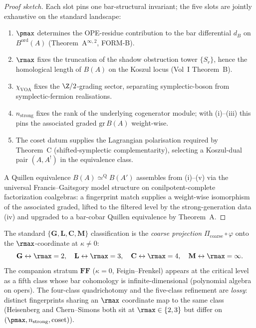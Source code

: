 \begin{proof}[Proof sketch]
Each slot pins one bar-structural invariant; the five slots are jointly exhaustive on the standard landscape:
\begin{enumerate}
 \item[(i)] $\pmax$ determines the OPE-residue contribution to the bar differential $d_B$ on $B^{\mathrm{ord}}(A)$ (Theorem~A$^{\infty,2}$, FORM-B).
 \item[(ii)] $\rmax$ fixes the truncation of the shadow obstruction tower $\{S_r\}$, hence the homological length of $B(A)$ on the Koszul locus (Vol~I Theorem~B).
 \item[(iii)] $\chi_{\mathrm{VOA}}$ fixes the $\Z/2$-grading sector, separating symplectic-boson from symplectic-fermion realisations.
 \item[(iv)] $n_{\mathrm{strong}}$ fixes the rank of the underlying cogenerator module; with (i)--(iii) this pins the associated graded $\mathrm{gr}\, B(A)$ weight-wise.
 \item[(v)] The coset datum supplies the Lagrangian polarisation required by Theorem~C (shifted-symplectic complementarity), selecting a Koszul-dual pair $(A, A^!)$ in the equivalence class.
\end{enumerate}
A Quillen equivalence $B(A) \simeq^{\mathrm{Q}} B(A')$ assembles from (i)--(v) via the universal Francis--Gaitsgory model structure on conilpotent-complete factorization coalgebras: a fingerprint match supplies a weight-wise isomorphism of the associated graded, lifted to the filtered level by the strong-generation data (iv) and upgraded to a bar-cobar Quillen equivalence by Theorem~A.
\end{proof}

\begin{remark}
\label{rem:five-class-coarse-projection}
The standard $\{\mathbf{G},\mathbf{L},\mathbf{C},\mathbf{M}\}$ classification is the \emph{coarse projection} $\Pi_{\mathrm{coarse}} \circ \varphi$ onto the $\rmax$-coordinate at $\kappa \neq 0$:
\[
 \mathbf{G} \leftrightarrow \rmax = 2, \quad
 \mathbf{L} \leftrightarrow \rmax = 3, \quad
 \mathbf{C} \leftrightarrow \rmax = 4, \quad
 \mathbf{M} \leftrightarrow \rmax = \infty.
\]
The companion stratum $\mathbf{FF}$ ($\kappa = 0$, Feigin--Frenkel) appears at the critical level as a fifth class whose bar cohomology is infinite-dimensional (polynomial algebra on opers). The four-class quadrichotomy and the five-class refinement are \emph{lossy}: distinct fingerprints sharing an $\rmax$ coordinate map to the same class (Heisenberg and Chern--Simons both sit at $\rmax \in \{2, 3\}$ but differ on $(\pmax, n_{\mathrm{strong}}, \mathrm{coset})$).
\end{remark}

